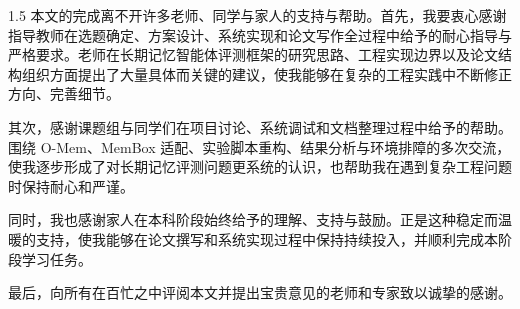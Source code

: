 
\begin{zhixie}
\begin{spacing}{1.5}
本文的完成离不开许多老师、同学与家人的支持与帮助。首先，我要衷心感谢指导教师在选题确定、方案设计、系统实现和论文写作全过程中给予的耐心指导与严格要求。老师在长期记忆智能体评测框架的研究思路、工程实现边界以及论文结构组织方面提出了大量具体而关键的建议，使我能够在复杂的工程实践中不断修正方向、完善细节。

其次，感谢课题组与同学们在项目讨论、系统调试和文档整理过程中给予的帮助。围绕 O-Mem、MemBox 适配、实验脚本重构、结果分析与环境排障的多次交流，使我逐步形成了对长期记忆评测问题更系统的认识，也帮助我在遇到复杂工程问题时保持耐心和严谨。

同时，我也感谢家人在本科阶段始终给予的理解、支持与鼓励。正是这种稳定而温暖的支持，使我能够在论文撰写和系统实现过程中保持持续投入，并顺利完成本阶段学习任务。

最后，向所有在百忙之中评阅本文并提出宝贵意见的老师和专家致以诚挚的感谢。
\end{spacing}
\end{zhixie}

